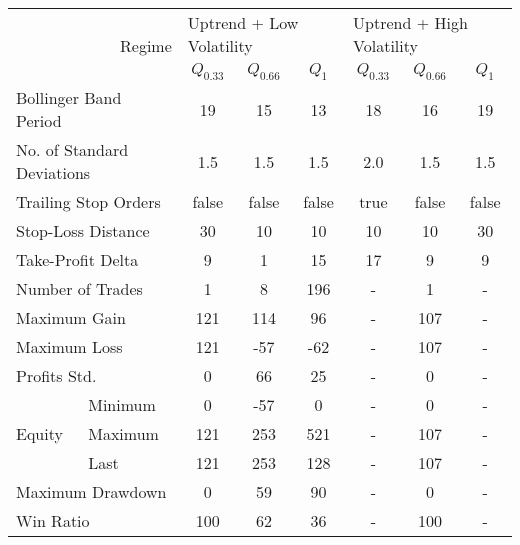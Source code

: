 \centering
\begin{tabular}{ll|cccccc}
    \toprule
    \multicolumn{2}{r|}{\multirow{2}{*}{Regime}} & \multicolumn{3}{l}{Uptrend + Low Volatility}     & \multicolumn{3}{l}{Uptrend + High Volatility}     \\
    \multicolumn{2}{r|}{} & $Q_{0.33}$ & $Q_{0.66}$ & $Q_{1}$ & $Q_{0.33}$ & $Q_{0.66}$ & $Q_{1}$ \\
    \midrule
    \multicolumn{2}{l|}{Bollinger Band Period} & 19 & 15 & 13 & 18 & 16 & 19 \\
    \multicolumn{2}{l|}{No. of Standard Deviations} & 1.5 & 1.5 & 1.5 & 2.0 & 1.5 & 1.5 \\
    \multicolumn{2}{l|}{Trailing Stop Orders} & false & false & false & true & false & false \\
    \multicolumn{2}{l|}{Stop-Loss Distance} & 30 & 10 & 10 & 10 & 10 & 30 \\
    \multicolumn{2}{l|}{Take-Profit Delta} & 9 & 1 & 15 & 17 & 9 & 9 \\
    \midrule
    \multicolumn{2}{l|}{Number of Trades} & 1 & 8 & 196 & - & 1 & - \\
    \multicolumn{2}{l|}{Maximum Gain} & 121 & 114 & 96 & - & 107 & - \\
    \multicolumn{2}{l|}{Maximum Loss} & 121 & -57 & -62 & - & 107 & - \\
    \multicolumn{2}{l|}{Profits Std.} & 0 & 66 & 25 & - & 0 & - \\
    \multirow{3}{*}{Equity} & Minimum & 0   & -57 & 0   & - & 0   & - \\
    & Maximum & 121 & 253 & 521 & - & 107 & - \\
    & Last    & 121 & 253 & 128 & - & 107 & - \\
    \multicolumn{2}{l|}{Maximum Drawdown} & 0 & 59 & 90 & - & 0 & - \\
    \multicolumn{2}{l|}{Win Ratio} & 100 & 62 & 36 & - & 100 & - \\
    \bottomrule
\end{tabular}